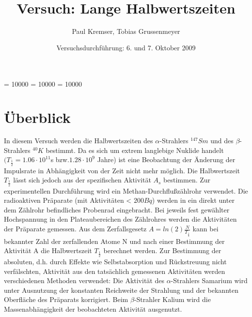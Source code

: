 \documentclass[12pt]{article}
\newcommand{\changefont}[3]{
\fontfamily{#1} \fontseries{#2} \fontshape{#3} \selectfont}
\begin{document}
\clubpenalty = 10000
\widowpenalty = 10000 
\displaywidowpenalty = 10000

\onehalfspacing
\changefont{ptm}{m}{n} 

\begin{titlepage}
\author{Paul Kremser, Tobias Grussenmeyer}
\title{Versuch: Lange Halbwertszeiten}
\date{Versuchsdurchführung: 6. und 7. Oktober 2009} 
\maketitle
\thispagestyle{empty}
\end{titlepage}


\tableofcontents
\thispagestyle{empty}
\newpage
{}
\section{Überblick}
In diesem Versuch werden die Halbwertszeiten des $\alpha$-Strahlers $ ^{147}Sm$ und des $\beta$- Strahlers $^{40}K$ bestimmt. Da es sich um extrem langlebige Nuklide handelt $(T_{\frac{1}{2}} =1.06 \cdot 10^{11}$s  bzw.$1.28 \cdot 10^9$ Jahre) ist eine Beobachtung der Änderung der Impulsrate in Abhängigkeit von der Zeit nicht mehr möglich. Die Halbwertszeit $T_{\frac{1}{2}}$ lässt sich jedoch aus der spezifischen Aktivität $A_s$ bestimmen. Zur experimentellen Durchführung wird ein Methan-Durchflußzählrohr verwendet. Die radioaktiven Präparate (mit Aktivitäten < $200 Bq$) werden in ein direkt unter dem Zählrohr befindliches Probenrad eingebracht. Bei jeweils fest gewählter Hochspannung in den Plateaubereichen des Zählrohres werden die Aktivitäten der Präparate gemessen. Aus dem Zerfallsgesetz $A = ln(2) \frac{N}{T_{\frac{1}{2}}}$ kann bei bekannter Zahl der zerfallenden Atome N und nach einer Bestimmung der Aktivität A die Halbwertszeit $T_{\frac{1}{2}}$ berechnet werden. Zur Bestimmung der absoluten, d.h. durch Effekte wie Selbstabsorption und Rückstreuung nicht verfälschten, Aktivität aus den tatsächlich gemessenen Aktivitäten werden verschiedenen Methoden verwendet: Die Aktivität des $\alpha$-Strahlers Samarium wird
unter Ausnutzung der konstanten Reichweite der Strahlung und der bekannten Oberfläche des Präparats korrigiert. Beim $\beta$-Strahler Kalium wird die Massenabhängigkeit der beobachteten Aktivität ausgenutzt.
\end{document}
